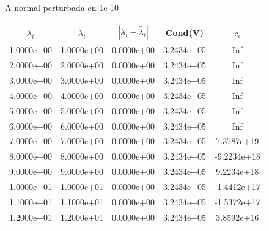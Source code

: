 \documentclass{article}
\begin{document}
\begin{itemize}
\begin{enumerate}[(a)]
\begin{figure}[h!]
\begin{tabular}{c|c|c|c|c}
\end{tabular}
\caption{A normal perturbada en 1e-10}
\end{figure}
\begin{figure}[h!]
\centering
\begin{tabular}{c|c|c|c|c}
$\lambda_{i}$&$\tilde{\lambda_{i}}$ &$|\lambda_{i}-\tilde{\lambda_{i}}|$ &Cond(V) &$c_i$\\
\hline
1.0000e+00&1.0000e+00&0.0000e+00&3.2434e+05&Inf\\
\hline
2.0000e+00&2.0000e+00&0.0000e+00&3.2434e+05&Inf\\
\hline
3.0000e+00&3.0000e+00&0.0000e+00&3.2434e+05&Inf\\
\hline
4.0000e+00&4.0000e+00&0.0000e+00&3.2434e+05&Inf\\
\hline
5.0000e+00&5.0000e+00&0.0000e+00&3.2434e+05&Inf\\
\hline
6.0000e+00&6.0000e+00&0.0000e+00&3.2434e+05&Inf\\
\hline
7.0000e+00&7.0000e+00&0.0000e+00&3.2434e+05&7.3787e+19\\
\hline
8.0000e+00&8.0000e+00&0.0000e+00&3.2434e+05&-9.2234e+18\\
\hline
9.0000e+00&9.0000e+00&0.0000e+00&3.2434e+05&9.2234e+18\\
\hline
1.0000e+01&1.0000e+01&0.0000e+00&3.2434e+05&-1.4412e+17\\
\hline
1.1000e+01&1.1000e+01&0.0000e+00&3.2434e+05&-1.5372e+17\\
\hline
1.2000e+01&1.2000e+01&0.0000e+00&3.2434e+05&3.8592e+16\\
\hline


\end{tabular}
\end{figure}
\end{enumerate}
\end{itemize}
\end{document}
